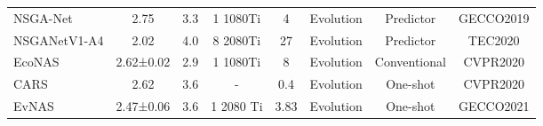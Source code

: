 \documentclass[sigconf]{acmart}
\begin{document}
\begin{table*}[!th]
\begin{tabular}{l|c|c|c|c|c|c|c}
NSGA-Net \cite{Ref:61}                               & 2.75                                                                                   & 3.3                                                           & 1 1080Ti                          & 4                                                                      & Evolution                                  & Predictor         &GECCO2019                          \\
NSGANetV1-A4 \cite{Ref:61}                               & 2.02                                                                                   & 4.0                                                           & 8 2080Ti                          & 27                                                                      & Evolution                                  & Predictor         &TEC2020                          \\
EcoNAS \cite{Ref:58}                                       & 2.62±0.02                                                                                      & 2.9                                                           & 1 1080Ti                                & 8                                                                       & Evolution                                  & Conventional  &CVPR2020                                     \\

CARS \cite{Ref:07}                                       & 2.62                                                                                       & 3.6                                                           & -                                & 0.4                                                                       & Evolution                                  & One-shot       &CVPR2020 \\
EvNAS \cite{Ref:62}                                       & 2.47±0.06                                                                                     & 3.6                                                           & 1 2080 Ti                                & 3.83                                                                       & Evolution                                  & One-shot       &GECCO2021 \\\hline


\end{tabular}
\end{table*}
\end{document}
